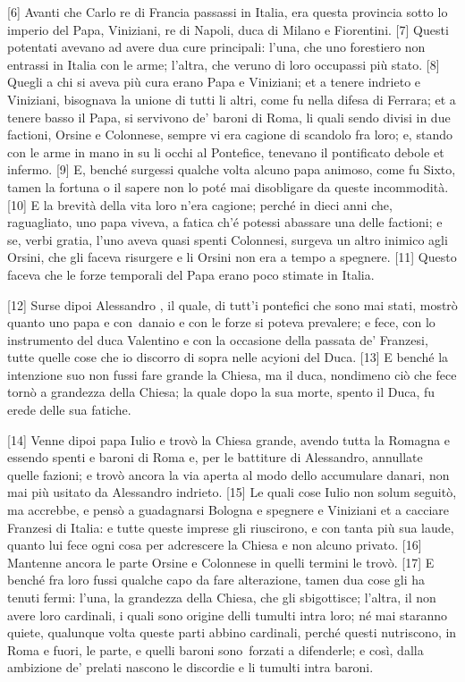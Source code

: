 \pagebreak

{[}6{]} Avanti che Carlo re di Francia passassi in Italia, era questa
provincia sotto lo imperio del Papa, Viniziani, re di Napoli, duca di
Milano e Fiorentini. {[}7{]} Questi potentati avevano ad avere dua cure
principali: l'una, che uno forestiero non entrassi in Italia con le
arme; l'altra, che veruno di loro occupassi più stato. {[}8{]} Quegli a
chi si aveva più cura erano Papa e Viniziani; et a tenere indrieto e
Viniziani, bisognava la unione di tutti li altri, come fu nella difesa
di Ferrara; et a tenere basso il Papa, si servivono de' baroni di Roma,
li quali sendo divisi in due factioni, Orsine e Colonnese, sempre vi era
cagione di scandolo fra loro; e, stando con le arme in mano in su li
occhi al Pontefice, tenevano il pontificato debole et infermo. {[}9{]}
E, benché surgessi qualche volta alcuno papa animoso, come fu Sixto,
tamen la fortuna o il sapere non lo poté mai disobligare da queste
incommodità. {[}10{]} E la brevità della vita loro n'era cagione; perché
in dieci anni che, raguagliato, uno papa viveva, a fatica ch'é potessi
abassare una delle factioni; e se, verbi gratia, l'uno aveva quasi
spenti Colonnesi, surgeva un altro inimico agli Orsini, che gli faceva
risurgere e li Orsini non era a tempo a spegnere. {[}11{]} Questo faceva
che le forze temporali del Papa erano poco stimate in Italia.

{[}12{]} Surse dipoi Alessandro , il quale, di tutt'i pontefici che
sono mai stati, mostrò quanto uno papa e con\est\ danaio e con le forze si
poteva prevalere; e fece, con lo instrumento del duca Valentino e con la
occasione della passata de' Franzesi, tutte quelle cose che io discorro
di sopra nelle acyioni del Duca. {[}13{]} E benché la intenzione suo non
fussi fare grande la Chiesa, ma il duca, nondimeno ciò che fece tornò a
grandezza della Chiesa; la quale dopo la sua morte, spento il Duca, fu
erede delle sua fatiche.

{[}14{]} Venne dipoi papa Iulio e trovò la Chiesa grande, avendo tutta
la Romagna e essendo spenti e baroni di Roma e, per le battiture di
Alessandro, annullate quelle fazioni; e trovò ancora la via aperta al
modo dello accumulare danari, non mai più usitato da Alessandro
indrieto. {[}15{]} Le quali cose Iulio non solum seguitò, ma accrebbe, e
pensò a guadagnarsi Bologna e spegnere e Viniziani et a cacciare
Franzesi di Italia: e tutte queste imprese gli riuscirono, e con tanta
più sua laude, quanto lui fece ogni cosa per adcrescere la Chiesa e non
alcuno privato. {[}16{]} Mantenne ancora le parte Orsine e Colonnese in
quelli termini le trovò. {[}17{]} E benché fra loro fussi qualche capo
da fare alterazione, tamen dua cose gli ha tenuti fermi: l'una, la
grandezza della Chiesa, che gli sbigottisce; l'altra, il non avere loro
cardinali, i quali sono origine delli tumulti intra loro; né mai
staranno quiete, qualunque volta queste parti abbino cardinali, perché
questi nutriscono, in Roma e fuori, le parte, e quelli baroni sono\est\
forzati a difenderle; e così, dalla ambizione de' prelati nascono le
discordie e li tumulti intra baroni.

